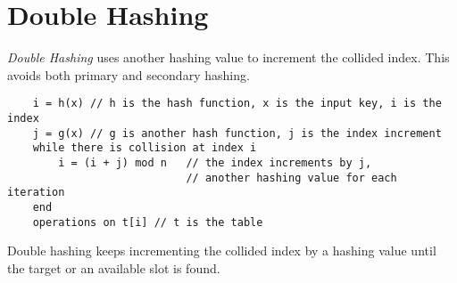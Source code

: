 \section{Double Hashing}
\textit{Double Hashing} uses another hashing value to increment the collided index. This avoids both primary and secondary hashing.
\begin{verbatim}
    i = h(x) // h is the hash function, x is the input key, i is the index
    j = g(x) // g is another hash function, j is the index increment
    while there is collision at index i
        i = (i + j) mod n   // the index increments by j, 
                            // another hashing value for each iteration
    end
    operations on t[i] // t is the table
\end{verbatim}

Double hashing keeps incrementing the collided index by a hashing value until the target or an available slot is found. 




